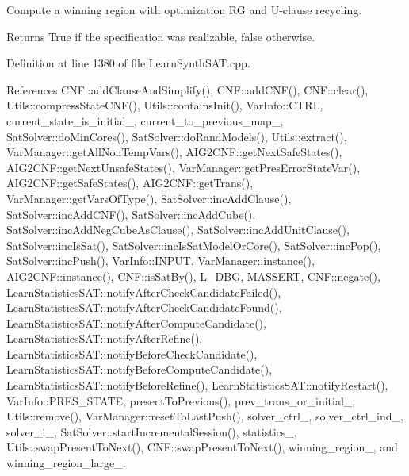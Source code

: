 Compute a winning region with optimization R\-G and U-\/clause recycling. 

\begin{DoxyReturn}{Returns}
True if the specification was realizable, false otherwise. 
\end{DoxyReturn}


Definition at line 1380 of file Learn\-Synth\-S\-A\-T.\-cpp.



References C\-N\-F\-::add\-Clause\-And\-Simplify(), C\-N\-F\-::add\-C\-N\-F(), C\-N\-F\-::clear(), Utils\-::compress\-State\-C\-N\-F(), Utils\-::contains\-Init(), Var\-Info\-::\-C\-T\-R\-L, current\-\_\-state\-\_\-is\-\_\-initial\-\_\-, current\-\_\-to\-\_\-previous\-\_\-map\-\_\-, Sat\-Solver\-::do\-Min\-Cores(), Sat\-Solver\-::do\-Rand\-Models(), Utils\-::extract(), Var\-Manager\-::get\-All\-Non\-Temp\-Vars(), A\-I\-G2\-C\-N\-F\-::get\-Next\-Safe\-States(), A\-I\-G2\-C\-N\-F\-::get\-Next\-Unsafe\-States(), Var\-Manager\-::get\-Pres\-Error\-State\-Var(), A\-I\-G2\-C\-N\-F\-::get\-Safe\-States(), A\-I\-G2\-C\-N\-F\-::get\-Trans(), Var\-Manager\-::get\-Vars\-Of\-Type(), Sat\-Solver\-::inc\-Add\-Clause(), Sat\-Solver\-::inc\-Add\-C\-N\-F(), Sat\-Solver\-::inc\-Add\-Cube(), Sat\-Solver\-::inc\-Add\-Neg\-Cube\-As\-Clause(), Sat\-Solver\-::inc\-Add\-Unit\-Clause(), Sat\-Solver\-::inc\-Is\-Sat(), Sat\-Solver\-::inc\-Is\-Sat\-Model\-Or\-Core(), Sat\-Solver\-::inc\-Pop(), Sat\-Solver\-::inc\-Push(), Var\-Info\-::\-I\-N\-P\-U\-T, Var\-Manager\-::instance(), A\-I\-G2\-C\-N\-F\-::instance(), C\-N\-F\-::is\-Sat\-By(), L\-\_\-\-D\-B\-G, M\-A\-S\-S\-E\-R\-T, C\-N\-F\-::negate(), Learn\-Statistics\-S\-A\-T\-::notify\-After\-Check\-Candidate\-Failed(), Learn\-Statistics\-S\-A\-T\-::notify\-After\-Check\-Candidate\-Found(), Learn\-Statistics\-S\-A\-T\-::notify\-After\-Compute\-Candidate(), Learn\-Statistics\-S\-A\-T\-::notify\-After\-Refine(), Learn\-Statistics\-S\-A\-T\-::notify\-Before\-Check\-Candidate(), Learn\-Statistics\-S\-A\-T\-::notify\-Before\-Compute\-Candidate(), Learn\-Statistics\-S\-A\-T\-::notify\-Before\-Refine(), Learn\-Statistics\-S\-A\-T\-::notify\-Restart(), Var\-Info\-::\-P\-R\-E\-S\-\_\-\-S\-T\-A\-T\-E, present\-To\-Previous(), prev\-\_\-trans\-\_\-or\-\_\-initial\-\_\-, Utils\-::remove(), Var\-Manager\-::reset\-To\-Last\-Push(), solver\-\_\-ctrl\-\_\-, solver\-\_\-ctrl\-\_\-ind\-\_\-, solver\-\_\-i\-\_\-, Sat\-Solver\-::start\-Incremental\-Session(), statistics\-\_\-, Utils\-::swap\-Present\-To\-Next(), C\-N\-F\-::swap\-Present\-To\-Next(), winning\-\_\-region\-\_\-, and winning\-\_\-region\-\_\-large\-\_\-.

